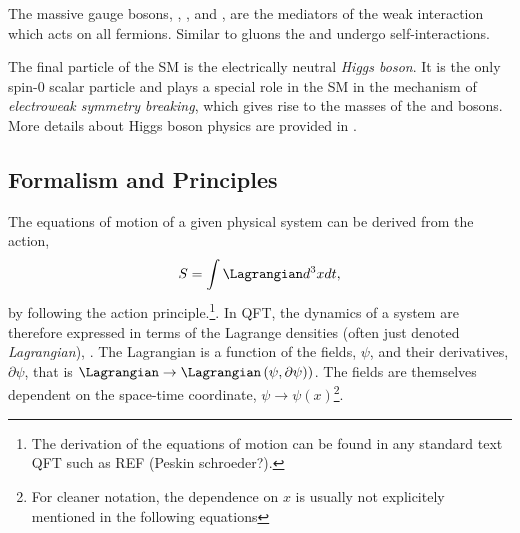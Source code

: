 The massive gauge bosons, \Wplus, \Wminus, and \Zboson, are the mediators of the weak interaction which acts on all fermions. Similar to gluons the \Wmp and \Zboson undergo self-interactions.

The final particle of the SM is the electrically neutral \emph{Higgs boson}. It is the only spin-0 scalar particle and plays a special role in the SM in the mechanism of \emph{electroweak symmetry breaking}, which gives rise to the masses of the \Wpm and \Zboson bosons. More details about Higgs boson physics are provided in .


\subsection{Formalism and Principles}
\label{subsec:formalism}

The equations of motion of a given physical system can be derived from the action,
\begin{equation}
  \label{eq:action}
  S = \int \Lagrangian d^3x dt,
\end{equation}
by following the action principle.\footnote{The derivation of the equations of motion can be found in any standard text QFT such as REF (Peskin schroeder?).}.
In QFT, the dynamics of a system are therefore expressed in terms of the Lagrange densities (often just denoted \emph{Lagrangian}), \Lagrangian. 
The Lagrangian is a function of the fields, $\psi$, and their derivatives, $\partial \psi$, that is $\Lagrangian \rightarrow \Lagrangian\left(\psi, \partial\psi)\right)$. The fields are themselves dependent on the space-time coordinate, $\psi \rightarrow \psi(x)$\footnote{For cleaner notation, the dependence on $x$ is usually not explicitely mentioned in the following equations}. 

